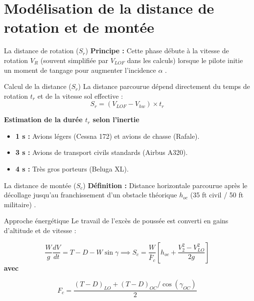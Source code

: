 	
\section{Modélisation de la distance de rotation et de montée}



	
	\begin{frame}{La distance de rotation ($S_r$)}
		\textbf{Principe :} Cette phase débute à la vitesse de rotation $V_R$ (souvent simplifiée par $V_{LOF}$ dans les calculs) lorsque le pilote initie un moment de tangage pour augmenter l'incidence $\alpha$ .
		
		\begin{block}{Calcul de la distance ($S_r$)}
			La distance parcourue dépend directement du temps de rotation $t_r$ et de la vitesse sol effective :
			\[ S_r = (V_{LOF} - V_{hw}) \times t_r \]
		\end{block}
		
		\textbf{Estimation de la durée $t_r$ selon l'inertie }
		\begin{itemize}
			\item \textbf{1 s :} Avions légers (Cessna 172) et avions de chasse (Rafale).
			\item \textbf{3 s :} Avions de transport civils standards (Airbus A320).
			\item \textbf{4 s :} Très gros porteurs (Beluga XL).
		\end{itemize}
	
		
	\end{frame}
	
	
	
	\begin{frame}{La distance de montée ($S_c$)}
		\textbf{Définition :} Distance horizontale parcourue après le décollage jusqu'au franchissement d'un obstacle théorique $h_{oc}$ (35 ft civil / 50 ft militaire) .
		
		\begin{block}{Approche énergétique }
			Le travail de l'excès de poussée est converti en gains d'altitude et de vitesse :
			
			\[ \frac{W}{g} \frac{dV}{dt} = T - D - W \sin \gamma \implies S_c = \frac{W}{\bar{F}_c} \left[ h_{oc} + \frac{V_2^2 - V_{LO}^2}{2g} \right] \]
			\textbf{avec }
			
			\[ F_c = \frac{(T - D)_{LO} + (T - D)_{OC} / \cos(\gamma_{OC})}{2} \]
		\end{block}
		
		
	\end{frame}
	
